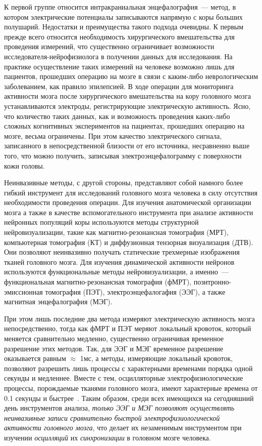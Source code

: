 К первой группе относится интракраниальная энцефалография~--- метод, в котором
электрические потенциалы записываются напрямую с коры больших полушарий.
Недостатки и преимущества такого подхода очевидны. К первым прежде всего
относится необходимость хирургического вмешательства для проведения измерений,
что существенно ограничивает возможности исследователя-нейрофизиолога в
получении данных для исследования.  На практике осуществление таких измерений
на человеке возможно лишь для пациентов, прошедших операцию на мозге в связи с
каким-либо неврологическим заболеванием, как правило эпилепсией.  В ходе
операции для мониторинга активности мозга после хирургического вмешательства на
кору головного мозга устанавливаются электроды, регистрирующие электрическую
активность.  Ясно, что количество таких данных, как и  возможность проведения
каких-либо сложных когнитивных экспериментов на пациентах, прошедших операцию
на мозге, весьма ограничены.  При этом качество электрического сигнала,
записанного в непосредственной близости от его источника, несравненно выше
того, что можно получить, записывая электроэнцефалограмму с поверхности кожи
головы.

Неинвазивные методы, с другой стороны, представляют собой намного более гибкий
инструмент для исследований головного мозга человека в силу отсутствия
необходимости проведения операции.  Для изучения анатомической организации
мозга а также в качестве вспомогательного инструмента при анализе активности
нейронных популяций коры используются методы структурной нейровизуализации,
такие как магнитно-резонансная томография (МРТ), компьютерная томография (КТ) и
диффузионная тензорная визуализация (ДТВ).  Они позволяют неинвазивно получать
статические трехмерные изображения тканей головного мозга.  Для изучения
динамической активности нейронов используются функциональные методы
нейровизуализации, а именно~---  функциональная магнитно-резонансная томография
(фМРТ), позитронно-эмиссионная томография (ПЭТ), электроэнцефалогафия (ЭЭГ), а
также магнитная энцефалография (МЭГ).

При этом лишь последние два метода измеряют электрическую активность мозга
непосредственно, тогда как фМРТ и ПЭТ меряют локальный кровоток, который
меняется сравнительно медленно, существенно ограничивая временное разрешение
этих методов.  Так, для ЭЭГ и МЭГ временное разрешение оказывается равным
$\approx$ 1мс, а методы, измеряющие локальный кровоток, позволяют разрешить
лишь процессы с характерными временами порядка одной секунды и медленнее.
Вместе с тем, осцилляторные электрофизиологические процессы, порождаемые
тканями головного мозга, имеют характерные времена от 0.1 секунды и быстрее~\cite{buzsaki}.
Таким образом, среди
всех имеющихся на сегодняшний день инструментов анализа,
\emph{только ЭЭГ и МЭГ позволяют осуществлять неинвазивные записи сравнительно быстрой
электрофизиологической активности головного мозга}, что делает их незаменимым
инструментом при изучении \emph{осцилляций} их \emph{синхронизации} в головном
мозге человека.

